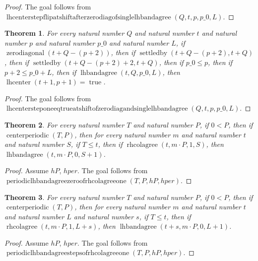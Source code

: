 \documentclass[11pt]{article}
\newtheorem{theorem}{Theorem}[section]
\theoremstyle{definition}
\begin{document}
\begin{proof}
The goal follows from \(\operatorname{lhcenterstepflipatshiftafterzerodiagofsinglelhbandagree}(Q, t, p, p\_0, L)\).
\end{proof}
\begin{theorem}
\label{ll:paper:lhcenter-step-one-eq-true-at-shift-of-zero-diag-and-single-lhbandagree}
For every natural number \(Q\) and natural number \(t\) and natural number \(p\) and natural number \(p\_0\) and natural number \(L\), if \(\operatorname{zerodiagonal}(t + Q - (p + 2))\), then if \(\operatorname{settledby}(t + Q - (p + 2), t + Q)\), then if \(\operatorname{settledby}(t + Q - (p + 2) + 2, t + Q)\), then if \(p\_0 \le p\), then if \(p + 2 \le p\_0 + L\), then if \(\operatorname{lhbandagree}(t, Q, p\_0, L)\), then \(\operatorname{lhcenter}(t + 1, p + 1) = \operatorname{true}\).
\end{theorem}
\begin{proof}
The goal follows from \(\operatorname{lhcentersteponeeqtrueatshiftofzerodiagandsinglelhbandagree}(Q, t, p, p\_0, L)\).
\end{proof}
\begin{theorem}
\label{ll:paper:periodic-lhbandagree-zero-of-rhcolagree-one}
For every natural number \(T\) and natural number \(P\), if \(0 < P\), then if \(\operatorname{centerperiodic}(T, P)\), then for every natural number \(m\) and natural number \(t\) and natural number \(S\), if \(T \le t\), then if \(\operatorname{rhcolagree}(t, m \cdot P, 1, S)\), then \(\operatorname{lhbandagree}(t, m \cdot P, 0, S + 1)\).
\end{theorem}
\begin{proof}
Assume \(hP\), \(hper\).
The goal follows from \(\operatorname{periodiclhbandagreezeroofrhcolagreeone}(T, P, hP, hper)\).
\end{proof}
\begin{theorem}
\label{ll:paper:periodic-lhbandagree-steps-of-rhcolagree-one}
For every natural number \(T\) and natural number \(P\), if \(0 < P\), then if \(\operatorname{centerperiodic}(T, P)\), then for every natural number \(m\) and natural number \(t\) and natural number \(L\) and natural number \(s\), if \(T \le t\), then if \(\operatorname{rhcolagree}(t, m \cdot P, 1, L + s)\), then \(\operatorname{lhbandagree}(t + s, m \cdot P, 0, L + 1)\).
\end{theorem}
\begin{proof}
Assume \(hP\), \(hper\).
The goal follows from \(\operatorname{periodiclhbandagreestepsofrhcolagreeone}(T, P, hP, hper)\).
\end{proof}
\end{document}

